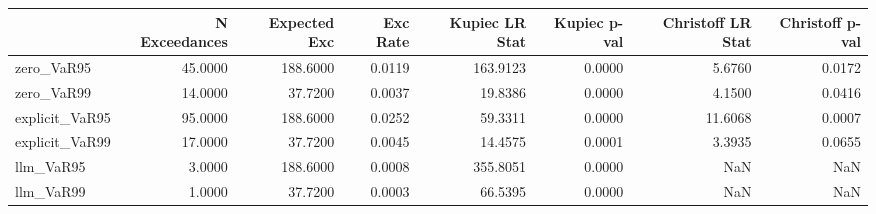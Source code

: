 \begin{tabular}{lrrrrrrr}
\toprule
 & N Exceedances & Expected Exc & Exc Rate & Kupiec LR Stat & Kupiec p-val & Christoff LR Stat & Christoff p-val \\
\midrule
zero_VaR95 & 45.0000 & 188.6000 & 0.0119 & 163.9123 & 0.0000 & 5.6760 & 0.0172 \\
zero_VaR99 & 14.0000 & 37.7200 & 0.0037 & 19.8386 & 0.0000 & 4.1500 & 0.0416 \\
explicit_VaR95 & 95.0000 & 188.6000 & 0.0252 & 59.3311 & 0.0000 & 11.6068 & 0.0007 \\
explicit_VaR99 & 17.0000 & 37.7200 & 0.0045 & 14.4575 & 0.0001 & 3.3935 & 0.0655 \\
llm_VaR95 & 3.0000 & 188.6000 & 0.0008 & 355.8051 & 0.0000 & NaN & NaN \\
llm_VaR99 & 1.0000 & 37.7200 & 0.0003 & 66.5395 & 0.0000 & NaN & NaN \\
\bottomrule
\end{tabular}
